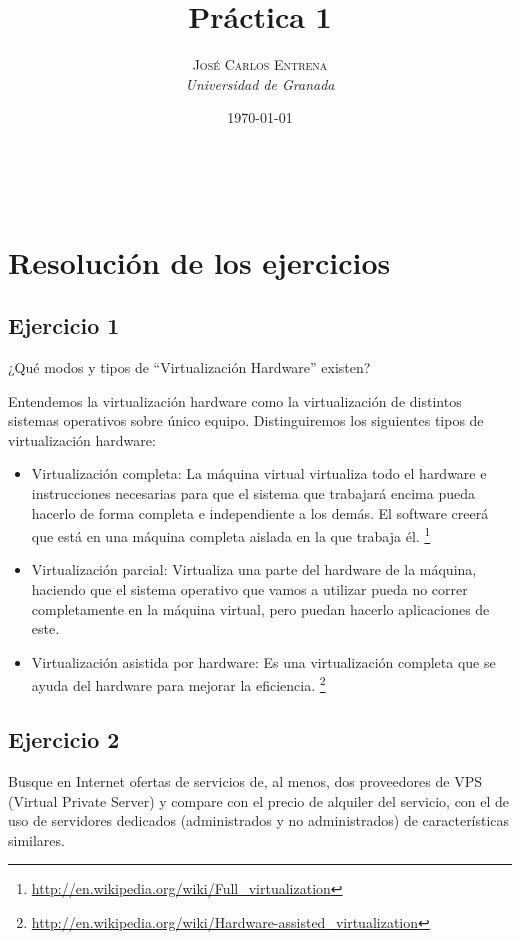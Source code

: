 \documentclass[a4paper, 11pt]{article} %
\title{\textbf{Práctica 1}\\ %
} %
\author{\textsc{José Carlos Entrena} %
\\{\textit{Universidad de Granada}}} %
\date{\today} %
\makeatletter
\renewcommand{\maketitle}{ %
\begin{flushright} %
{\LARGE\@title} %

\vspace{60pt} %

{\large\@author} %
\\\@date %

\vspace{40pt} %
\end{flushright}
}
\makeatother
\begin{document}
\maketitle %

{\parskip=2pt
  \tableofcontents
}   %

\pagebreak %

\section{Resolución de los ejercicios}

\subsection*{Ejercicio 1}
¿Qué modos y tipos de “Virtualización Hardware” existen?

Entendemos la virtualización hardware como la virtualización de distintos sistemas operativos sobre único equipo. 
Distinguiremos los siguientes tipos de virtualización hardware: 
\begin{itemize}
\item Virtualización completa: La máquina virtual virtualiza todo el hardware e instrucciones necesarias para que el sistema que trabajará encima pueda hacerlo de forma completa e independiente a los demás. El software creerá que está en una máquina completa aislada en la que trabaja él. \footnote{\url{http://en.wikipedia.org/wiki/Full_virtualization}}
\item Virtualización parcial: Virtualiza una parte del hardware de la máquina, haciendo que el sistema operativo que vamos a utilizar pueda no correr completamente en la máquina virtual, pero puedan hacerlo aplicaciones de este. 
\item Virtualización asistida por hardware: Es una virtualización completa que se ayuda del hardware para mejorar la eficiencia. \footnote{\url{http://en.wikipedia.org/wiki/Hardware-assisted_virtualization}}
\end{itemize}

\subsection*{Ejercicio 2}
Busque en Internet ofertas de servicios de, al menos, dos proveedores de VPS (Virtual Private Server) y compare con el precio de alquiler del servicio, con el de uso de servidores dedicados (administrados y no administrados) de características similares.
\end{document}
